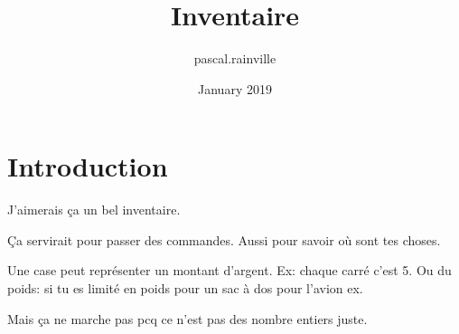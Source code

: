 \documentclass{article}
\title{Inventaire}
\author{pascal.rainville }
\date{January 2019}
\begin{document}
\maketitle

\section{Introduction}

J'aimerais ça un bel inventaire.

Ça servirait pour passer des commandes. Aussi pour savoir où sont tes choses.

Une case peut représenter un montant d'argent. Ex: chaque carré c'est 5.
Ou du poids: si tu es limité en poids pour un sac à dos pour l'avion ex.

Mais ça ne marche pas pcq ce n'est pas des nombre entiers juste.
\end{document}
